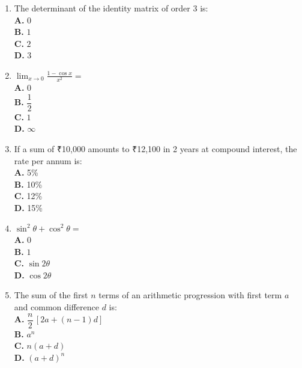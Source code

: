 \documentclass[11pt]{article}
\begin{document}
\begin{enumerate}[label=Q\arabic*., leftmargin=*]
\item The determinant of the identity matrix of order $3$ is:
\\[0.25em]
\textbf{A.} $0$\\
\textbf{B.} $1$\\
\textbf{C.} $2$\\
\textbf{D.} $3$

\item $\displaystyle \lim_{x\to 0} \frac{1 - \cos x}{x^2} =$ 
\\[0.25em]
\textbf{A.} $0$\\
\textbf{B.} $\dfrac{1}{2}$\\
\textbf{C.} $1$\\
\textbf{D.} $\infty$

\item If a sum of ₹10,000 amounts to ₹12,100 in 2 years at compound interest, the rate per annum is:
\\[0.25em]
\textbf{A.} 5\%\\
\textbf{B.} 10\%\\
\textbf{C.} 12\%\\
\textbf{D.} 15\%

\item $\sin^2\theta + \cos^2\theta =$ 
\\[0.25em]
\textbf{A.} $0$\\
\textbf{B.} $1$\\
\textbf{C.} $\sin 2\theta$\\
\textbf{D.} $\cos 2\theta$

\item The sum of the first $n$ terms of an arithmetic progression with first term $a$ and common difference $d$ is:
\\[0.25em]
\textbf{A.} $\dfrac{n}{2}\,[2a + (n-1)d]$\\
\textbf{B.} $a^n$\\
\textbf{C.} $n(a+d)$\\
\textbf{D.} $(a+d)^n$

\end{enumerate}
\end{document}
